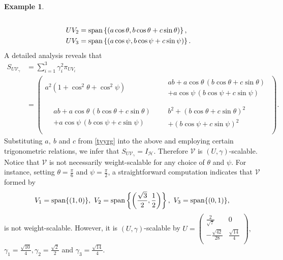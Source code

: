 \documentclass[sn-mathphys-num]{sn-jnl}%
\theoremstyle{definition}
\newtheorem{example}[theorem]{Example}
\theoremstyle{remark}
\numberwithin{equation}{section}
\begin{document}
\begin{example}
\begin{align*}
\\UV_{2}&=\textnormal{span}\left\lbrace \left( a\cos\theta , b\cos\theta + c\sin\theta \right) \right\rbrace ,
\\UV_{3}&=\textnormal{span}\left\lbrace \left( a\cos\psi , b\cos\psi + c\sin\psi \right) \right\rbrace .
\end{align*}
A detailed analysis reveals that
\begin{align*}
S_{U\mathcal{V}_{\gamma}}&=\sum_{i=1}^{3}\gamma_{i}^{2}\pi_{UV_{i}}
\\&=\begin{pmatrix}
   a^2\left( 1+\cos^{2}\theta + \cos^{2}\psi \right)  &
\begin{aligned}  &ab+a\cos\theta\,(b\cos\theta +c\sin\theta) 
                        \\&+a\cos\psi\,(b\cos\psi +c\sin\psi) \end{aligned}  \\ 
\\ \begin{aligned} &ab+a\cos\theta\,(b\cos\theta +c\sin\theta)
                       \\&+a\cos\psi\,(b\cos\psi +c\sin\psi) \end{aligned} &
\begin{aligned} &b^2+(b\cos\theta +c\sin\theta)^2 
                       \\&+(b\cos\psi +c\sin\psi)^2  \end{aligned} \\
\end{pmatrix}.
\end{align*}
Substituting $a,~b$ and $c$ from \eqref{tyyrg} into the above and employing certain trigonometric relations, we infer that $S_{U\mathcal{V}_{\gamma}}=I_{\mathcal{H}}.$ Therefore $\mathcal{V}$ is $(U,\gamma)$-scalable. Notice that $\mathcal{V}$ is not necessarily weight-scalable for any choice of $\theta$ and $\psi$. For instance, setting $\theta=\frac{\pi}{6}$ and $\psi=\frac{\pi}{2}$, a straightforward computation indicates that $\mathcal{V}$ formed by 
\begin{equation*}
V_{1}=\textnormal{span}\{(1,0)\},~V_{2}=\textnormal{span}\left\lbrace \left( \frac{\sqrt{3}}{2},\frac{1}{2}\right) \right\rbrace ,~V_{3}=\textnormal{span}\{(0,1)\},
\end{equation*}
is not weight-scalable. However, it is $(U,\gamma)$-scalable by $U=\begin{pmatrix}
   \frac{2}{\sqrt{7}}  &  0 \\
   -\frac{\sqrt{42}}{28}  &  \frac{\sqrt{14}}{4}  \\
\end{pmatrix},$
\\$ \gamma_{1}=\frac{\sqrt{10}}{4}, \gamma_{2}=\frac{\sqrt{2}}{2}$ and $ \gamma_{3}=\frac{\sqrt{14}}{4}$.
\end{example}
\end{document}
